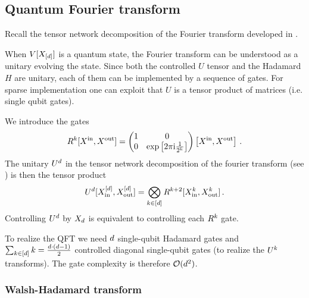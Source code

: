 \subsection{Quantum Fourier transform}

Recall the tensor network decomposition of the Fourier transform developed in .

When $V[X_{[d]}]$ is a quantum state, the Fourier transform can be understood as a unitary evolving the state.
Since both the controlled $U$ tensor and the Hadamard $H$ are unitary, each of them can be implemented by a sequence of gates.
For sparse implementation one can exploit that $U$ is a tensor product of matrices (i.e. single qubit gates).

We introduce the gates
\begin{align*}
    R^{k}[X^{\mathrm{in}},X^{\mathrm{out}}] =
    \begin{pmatrix} 
        1 & 0 \\
        0 & \mathrm{exp}\left[2\pi\mathrm{i} \frac{1}{2^k}\right]
     \end{pmatrix}\left[X^{\mathrm{in}},X^{\mathrm{out}}\right] \, .
\end{align*}
The unitary $U^{d}$ in the tensor network decomposition of the fourier transform (see ) is then the tensor product
\begin{align*}
    U^{d}[X_{\mathrm{in}}^{[d]},X_{\mathrm{out}}^{[d]}]
    = \bigotimes_{k\in[d]} R^{k+2}[X_{\mathrm{in}}^{k},X_{\mathrm{out}}^{k}] \, .
\end{align*}
Controlling $U^{d}$ by $X_{d}$ is equivalent to controlling each $R^{k}$ gate.


To realize the QFT we need $d$ single-qubit Hadamard gates and $\sum_{k\in[d]} k = \frac{d\cdot(d-1)}{2}$ controlled diagonal single-qubit gates (to realize the $U^{k}$ transforms).
The gate complexity is therefore $\mathcal{O}(d^2)$.

\subsubsection{Walsh-Hadamard transform}

